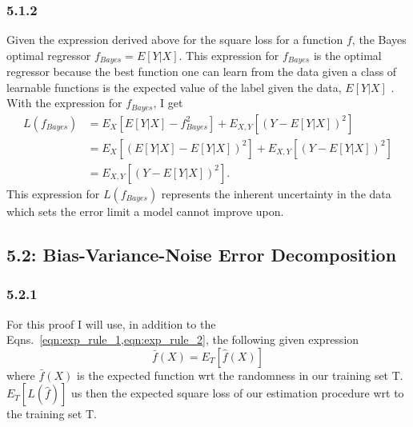 \documentclass[12pt]{amsart}
\begin{document}
\subsubsection*{5.1.2}
Given the expression derived above for the square loss for a function $f$, the Bayes optimal regressor $f_{Bayes} = E[Y|X]$.  This expression for $f_{Bayes}$ is the optimal regressor because the best function one can learn from the data given a class of learnable functions is the expected value of the label given the data, $E[Y|X]$ .  With the expression for $f_{Bayes}$, I get 
\begin{equation}
\begin{split}
L(f_{Bayes}) & = E_X[E[Y|X] - f_{Bayes}^2] + E_{X,Y}[(Y - E[Y|X])^2] \\
& = E_X[(E[Y|X] - E[Y|X])^2] + E_{X,Y}[(Y - E[Y|X])^2] \\
& = E_{X,Y}[(Y - E[Y|X])^2].
\end{split}
\end{equation}
This expression for $L(f_{Bayes})$ represents the inherent uncertainty in the data which sets the error limit a model cannot improve upon.

\subsection*{5.2: Bias-Variance-Noise Error Decomposition}

\subsubsection*{5.2.1}

For this proof I will use, in addition to the Eqns.~\ref{eqn:exp_rule_1,eqn:exp_rule_2}, the following given expression
\begin{equation} \label{eqn:fhat_fbar}
\bar{f}(X) = E_T[\hat{f}(X)]
\end{equation}
where $\bar{f}(X)$ is the expected function wrt the randomness in our training set T.  $E_T[L(\hat{f})]$ us then the expected square loss of our estimation procedure wrt to the training set T.
\end{document}
